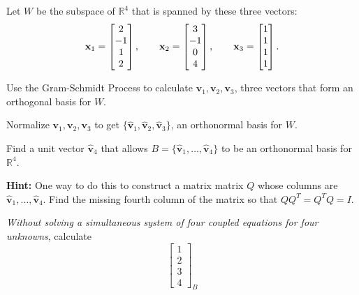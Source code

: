 \documentclass[boxes]{gsypset}
\begin{document}
\begin{problem}
	Let $W$ be the subspace of $\mathbb{R}^4$ that is spanned by these three vectors:
	\[
		\mathbf{x}_1=\begin{bmatrix}2\\-1\\1\\2\end{bmatrix},
		\qquad
		\mathbf{x}_2=\begin{bmatrix}3\\-1\\0\\4\end{bmatrix},
		\qquad
		\mathbf{x}_3=\begin{bmatrix}1\\1\\1\\1\end{bmatrix}.
	\]
	\begin{subproblems}
		\subproblem Use the Gram-Schmidt Process to calculate $\mathbf{v}_1,\mathbf{v}_2,\mathbf{v}_3$, 
			three vectors that form an orthogonal basis for $W$.
			\begin{solution}
				
			\end{solution}
		\subproblem Normalize $\mathbf{v}_1,\mathbf{v}_2,\mathbf{v}_3$ to get 
			$\{\hat{\mathbf{v}}_1,\hat{\mathbf{v}}_2,\hat{\mathbf{v}}_3\}$, an orthonormal basis for $W$.
			\begin{solution}
				
			\end{solution}
		\subproblem Find a unit vector $\hat{\mathbf{v}}_4$ that allows 
			$B=\{\hat{\mathbf{v}}_1,\dots,\hat{\mathbf{v}}_4\}$ to be an orthonormal basis for $\mathbb{R}^4$.
			
			\textbf{Hint:} One way to do this to construct a matrix matrix $Q$ whose columns are 
			$\hat{\mathbf{v}}_1,\dots,\hat{\mathbf{v}}_4$. 
			Find the missing fourth column of the matrix so that $QQ^T=Q^TQ=I$.
			\begin{solution}
				
			\end{solution}
		\subproblem \textit{Without solving a simultaneous system of four coupled equations for four unknowns},
			calculate
			\[
				\left[\begin{matrix}1\\2\\3\\4\end{matrix}\right]_B
			\]
			\begin{solution}
				
			\end{solution}
	\end{subproblems}
\end{problem}
\end{document}
